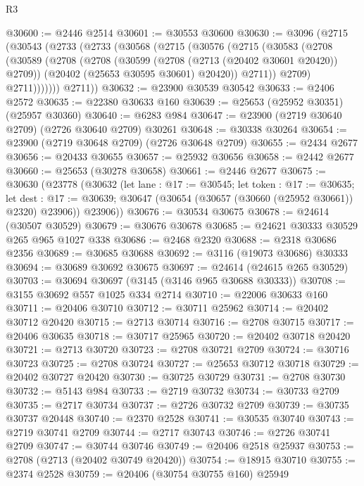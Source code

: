 \begin{lexlean}{R3}
\begin{coremodule}
@30600 := @2446 @2514
@30601 := @30553 @30600
@30630 := @3096
    (@2715
      (@30543
        (@2733
          (@2733
            (@30568
              (@2715
                (@30576
                  (@2715
                    (@30583
                      (@2708
                        (@30589
                          (@2708
                            (@2708
                              (@30599 (@2708 (@2713 (@20402 @30601 @20420)) @2709))
                              (@20402 (@25653 @30595 @30601) @20420))
                            @2711))
                        @2709)
                      @2711)))))))
        @2711))
@30632 := @23900 @30539 @30542
@30633 := @2406 @2572
@30635 := @22380 @30633 @160
@30639 := @25653 (@25952 @30351) (@25957 @30360)
@30640 := @6283 @984
@30647 := @23900 (@2719 @30640 @2709) (@2726 @30640 @2709) @30261
@30648 := @30338 @30264
@30654 := @23900 (@2719 @30648 @2709) (@2726 @30648 @2709)
@30655 := @2434 @2677
@30656 := @20433 @30655
@30657 := @25932 @30656
@30658 := @2442 @2677
@30660 := @25653 (@30278 @30658)
@30661 := @2446 @2677
@30675 := @30630
    (@23778
      (@30632
        (let lane : @17 := @30545;
        let token : @17 := @30635;
        let dest : @17 := @30639; @30647 (@30654 (@30657 (@30660 (@25952 @30661)) @2320) @23906))
        @23906))
@30676 := @30534 @30675
@30678 := @24614 (@30507 @30529)
@30679 := @30676 @30678
@30685 := @24621 @30333 @30529 @265 @965 @1027 @338
@30686 := @2468 @2320
@30688 := @2318 @30686 @2356
@30689 := @30685 @30688
@30692 := @3116 (@19073 @30686) @30333
@30694 := @30689 @30692 @30675
@30697 := @24614 (@24615 @265 @30529)
@30703 := @30694 @30697 (@3145 (@3146 @965 @30688 @30333))
@30708 := @3155 @30692 @557 @1025 @334 @2714
@30710 := @22006 @30633 @160
@30711 := @20406 @30710
@30712 := @30711 @25962
@30714 := @20402 @30712 @20420
@30715 := @2713 @30714
@30716 := @2708 @30715
@30717 := @20406 @30635
@30718 := @30717 @25965
@30720 := @20402 @30718 @20420
@30721 := @2713 @30720
@30723 := @2708 @30721 @2709
@30724 := @30716 @30723
@30725 := @2708 @30724
@30727 := @25653 @30712 @30718
@30729 := @20402 @30727 @20420
@30730 := @30725 @30729
@30731 := @2708 @30730
@30732 := @5143 @984
@30733 := @2719 @30732
@30734 := @30733 @2709
@30735 := @2717 @30734
@30737 := @2726 @30732 @2709
@30739 := @30735 @30737 @20448
@30740 := @2370 @2528
@30741 := @30535 @30740
@30743 := @2719 @30741 @2709
@30744 := @2717 @30743
@30746 := @2726 @30741 @2709
@30747 := @30744 @30746
@30749 := @20406 @2518 @25937
@30753 := @2708 (@2713 (@20402 @30749 @20420))
@30754 := @18915 @30710
@30755 := @2374 @2528
@30759 := @20406 (@30754 @30755 @160) @25949

\end{coremodule}
\end{lexlean}
